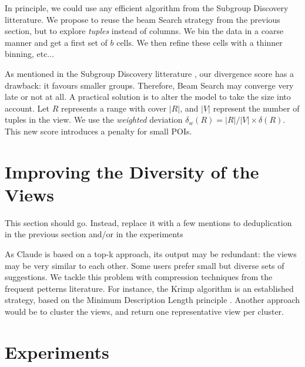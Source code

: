 In principle, we could use any efficient algorithm from the Subgroup Discovery
litterature.  We propose to reuse the beam Search strategy from the previous
section, but to explore \emph{tuples} instead of columns. We bin the data in a
coarse manner and get a first set of $b$ cells. We then refine these cells with
a thinner binning, etc...

As mentioned in the Subgroup Discovery litterature \cite{van2011non}, our
divergence score has a drawback: it favours smaller groups.  Therefore, Beam
Search may converge very late or not at all.  A practical
solution is to alter the model to take the size into account. Let $R$
represents a range with cover $|R|$, and $|V|$ represent the number of tuples
in the view. We use the \emph{weighted} deviation $\delta_w(R) = |R|/|V| \times
\delta(R)$. This new score introduces a penalty for small POIs.


\section{Improving the Diversity of the Views}

{ \color{red} This section should go. Instead, replace it with a few mentions
to deduplication in the previous section and/or in the experiments}

As Claude is based on a top-k approach, its output may be redundant: the views
may be very similar to each other.  Some users prefer small but diverse sets of
suggestions.  We tackle this problem with compression techniques from the
frequent petterns literature. For instance, the Krimp algorithm is an
established strategy, based on the Minimum Description Length principle
\cite{vreeken2011krimp}. Another approach would be to cluster the views, and
return one representative view per cluster.


\section{Experiments}

